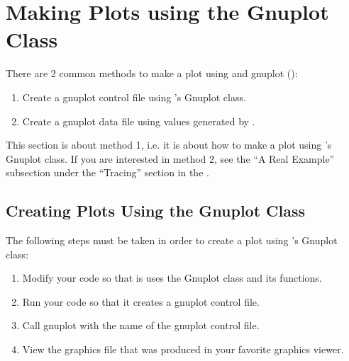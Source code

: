 \documentclass[letterpaper,10pt,english]{sphinxmanual}
\begin{document}
\chapter{Making Plots using the Gnuplot Class}
\label{\detokenize{gnuplot:making-plots-using-the-gnuplot-class}}\label{\detokenize{gnuplot::doc}}
There are 2 common methods to make a plot using  and gnuplot ():
\begin{enumerate}
%
\item {} 
Create a gnuplot control file using ’s Gnuplot class.

\item {} 
Create a gnuplot data file using values generated by .

\end{enumerate}

This section is about method 1, i.e. it is about how to make a plot using ’s Gnuplot class.  If you are interested in method 2, see the “A Real Example” subsection under the “Tracing” section in the  .


\section{Creating Plots Using the Gnuplot Class}
\label{\detokenize{gnuplot:creating-plots-using-the-gnuplot-class}}
The following steps must be taken in order to create a plot using ’s Gnuplot class:
\begin{enumerate}
%
\item {} 
Modify your code so that is uses the Gnuplot class and its functions.

\item {} 
Run your code so that it creates a gnuplot control file.

\item {} 
Call gnuplot with the name of the gnuplot control file.

\item {} 
View the graphics file that was produced in your favorite graphics viewer.

\end{enumerate}
\end{document}
